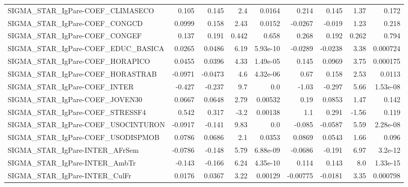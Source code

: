 \begin{tabular}{lrrrrrrrr}
SIGMA\_STAR\_IgPare-COEF\_CLIMASECO      &       0.105 &        0.145 &      2.4 &   0.0164 &      0.214 &       0.145 &         1.37 &         0.172 \\
SIGMA\_STAR\_IgPare-COEF\_CONGCD         &      0.0999 &        0.158 &     2.43 &   0.0152 &    -0.0267 &      -0.019 &         1.23 &         0.218 \\
SIGMA\_STAR\_IgPare-COEF\_CONGEF         &       0.137 &        0.191 &    0.442 &    0.658 &      0.268 &       0.192 &        0.262 &         0.794 \\
SIGMA\_STAR\_IgPare-COEF\_EDUC\_BASICA    &      0.0265 &       0.0486 &     6.19 & 5.93e-10 &    -0.0289 &     -0.0238 &         3.38 &      0.000724 \\
SIGMA\_STAR\_IgPare-COEF\_HORAPICO       &      0.0455 &       0.0396 &     4.33 & 1.49e-05 &      0.145 &      0.0969 &         3.75 &      0.000175 \\
SIGMA\_STAR\_IgPare-COEF\_HORASTRAB      &     -0.0971 &      -0.0473 &      4.6 & 4.32e-06 &       0.67 &       0.158 &         2.53 &        0.0113 \\
SIGMA\_STAR\_IgPare-COEF\_INTER          &      -0.427 &       -0.237 &      9.7 &      0.0 &      -1.03 &      -0.297 &         5.66 &      1.53e-08 \\
SIGMA\_STAR\_IgPare-COEF\_JOVEN30        &      0.0667 &       0.0648 &     2.79 &  0.00532 &       0.19 &      0.0853 &         1.47 &         0.142 \\
SIGMA\_STAR\_IgPare-COEF\_STRESSF4       &       0.542 &        0.317 &     -3.2 &  0.00138 &        1.1 &       0.291 &        -1.56 &         0.119 \\
SIGMA\_STAR\_IgPare-COEF\_USOCINTURON    &     -0.0917 &       -0.141 &     9.83 &      0.0 &     -0.085 &     -0.0587 &         5.59 &      2.28e-08 \\
SIGMA\_STAR\_IgPare-COEF\_USODISPMOB     &      0.0786 &       0.0686 &      2.1 &   0.0353 &     0.0869 &      0.0543 &         1.66 &         0.096 \\
SIGMA\_STAR\_IgPare-INTER\_AFrSem        &     -0.0786 &       -0.148 &     5.79 & 6.88e-09 &    -0.0686 &      -0.191 &         6.97 &       3.2e-12 \\
SIGMA\_STAR\_IgPare-INTER\_AmbTr         &      -0.143 &       -0.166 &     6.24 & 4.35e-10 &      0.114 &       0.143 &          8.0 &      1.33e-15 \\
SIGMA\_STAR\_IgPare-INTER\_CulFr         &      0.0176 &       0.0367 &     3.22 &  0.00129 &   -0.00775 &     -0.0181 &         3.35 &      0.000798 \\

\end{tabular}
